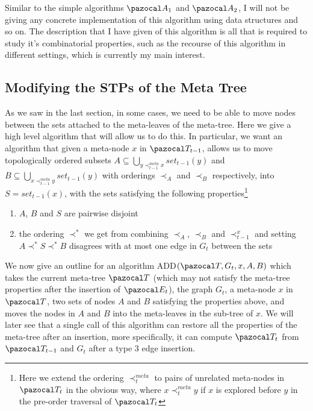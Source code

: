 \documentclass{report}
\begin{document}
Similar to the simple algorithms $\pazocal A_1$ and $\pazocal A_2$, I will not be giving any concrete implementation of this algorithm using data structures and so on. The description that I have given of this algorithm is all that is required to study it's combinatorial properties, such as the recourse of this algorithm in different settings, which is currently my main interest. 

\subsection{Modifying the STPs of the Meta Tree}

As we saw in the last section, in some cases, we need to be able to move nodes between the sets attached to the meta-leaves of the meta-tree. Here we give a high level algorithm that will allow us to do this. In particular, we want an algorithm that given a meta-node $x$ in $\pazocal T_{t-1}$, allows us to move topologically ordered subsets $A \subseteq \bigcup_{y \prec^{meta}_{t-1} x} set_{t-1}(y)$ and $B \subseteq \bigcup_{x \prec^{meta}_{t-1} y} set_{t-1}(y)$ with orderings $\prec_{A}$ and $\prec_{B}$ respectively, into $S=set_{t-1}(x)$, with the sets satisfying the following properties\footnote{Here we extend the ordering $\prec^{meta}_t$ to pairs of unrelated meta-nodes in $\pazocal T_t$ in the obvious way, where $x \prec^{meta}_t y$ if $x$ is explored before $y$ in the pre-order traversal of $\pazocal T_t$}

\begin{enumerate}
\item $A$, $B$ and $S$ are pairwise disjoint
\item the ordering $\prec^{*}$ we get from combining $\prec_{A}$, $\prec_{B}$ and $\prec_{t-1}^x$ and setting $A \prec^{*} S \prec^{*} B$ disagrees with at most one edge in $G_t$ between the sets
\end{enumerate}

We now give an outline for an algorithm ADD$(\pazocal T,G_t,x,A,B)$ which takes the current meta-tree $\pazocal T$ (which may not satisfy the meta-tree properties after the insertion of $\pazocal E_t$), the graph $G_t$, a meta-node $x$ in $\pazocal T$, two sets of nodes $A$ and $B$ satisfying the properties above, and moves the nodes in $A$ and $B$ into the meta-leaves in the sub-tree of $x$. We will later see that a single call of this algorithm can restore all the properties of the meta-tree after an insertion, more specifically, it can compute $\pazocal T_t$ from $\pazocal T_{t-1}$ and $G_t$ after a type 3 edge insertion.
\end{document}
